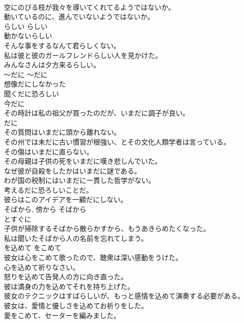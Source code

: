 \documentclass[8pt]{extreport}
\begin{document}
\begin{CJK}{UTF8}{min}
\\	空にのびる枝が我々を導いてくれてるようではないか。  
\\	動いているのに、進んでいないようではないか。  
\\	らしい	らしい	
\\	動かないらしい  
\\	そんな事をするなんて君らしくない。  
\\	私は彼と彼のガールフレンドらしい人を見かけた。  
\\	みんなさんは夕方来るらしい。  
\\	〜だに	〜だに	
\\	想像だにしなかった  
\\	聞くだに恐ろしい  
\\	今だに  
\\	その時計は私の祖父が買ったのだが、いまだに調子が良い。  
\\	だに 
\\	その質問はいまだに頭から離れない。   
\\	その州では未だに古い慣習が根強い、とその文化人類学者は言っている。   
\\	その傷はいまだに直らない。  
\\	その母親は子供の死をいまだに嘆き悲しんでいた。   
\\	なぜ彼が自殺をしたかはいまだに謎である。   
\\	わが国の税制にはいまだに一貫した哲学がない。   
\\	考えるだに恐ろしいことだ。  
\\	彼らはこのアイデアを一顧だにしない。   
\\	そばから, 傍から	そばから	
\\	とすぐに	
\\	子供が掃除するそばから散らかすから、もうあきらめたくなった。 
\\	私は聞いたそばから人の名前を忘れてしまう。   
\\	を込めて	をこめて	
\\	彼女は心をこめて歌ったので、聴衆は深い感動をうけた。   
\\	心を込めて祈りなさい。   
\\	怒りを込めて告発人の方に向き直った。   
\\	彼は満身の力を込めてそれを持ち上げた。   
\\	彼女のテクニックはすばらしいが、もっと感情を込めて演奏する必要がある。   
\\	彼女は、愛情と優しさを込めてお祈りをした。  
\\	愛をこめて、セーターを編みました。  

\end{CJK}
\end{document}
